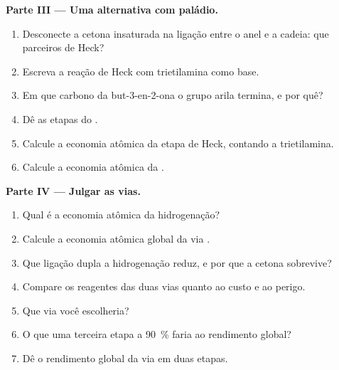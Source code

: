 \begin{problem}
\medskip
\noindent\textbf{Parte III --- Uma alternativa com paládio.}
\begin{enumerate}[resume]
  \item Desconecte a cetona insaturada na ligação entre o anel e a cadeia: que parceiros de
        Heck?
  \item Escreva a reação de Heck com trietilamina como base.
  \item Em que carbono da but-3-en-2-ona o grupo arila termina, e por quê?
  \item Dê as etapas do .
  \item Calcule a economia atômica da etapa de Heck, contando a trietilamina.
  \item Calcule a economia atômica da .
\end{enumerate}

\medskip
\noindent\textbf{Parte IV --- Julgar as vias.}
\begin{enumerate}[resume]
  \item Qual é a economia atômica da hidrogenação?
  \item Calcule a economia atômica global da via .
  \item Que ligação dupla a hidrogenação reduz, e por que a cetona sobrevive?
  \item Compare os reagentes das duas vias quanto ao custo e ao perigo.
  \item Que via você escolheria?
  \item O que uma terceira etapa a 90~\% faria ao rendimento global?
  \item Dê o rendimento global da via  em duas etapas.
\end{enumerate}
\end{problem}
